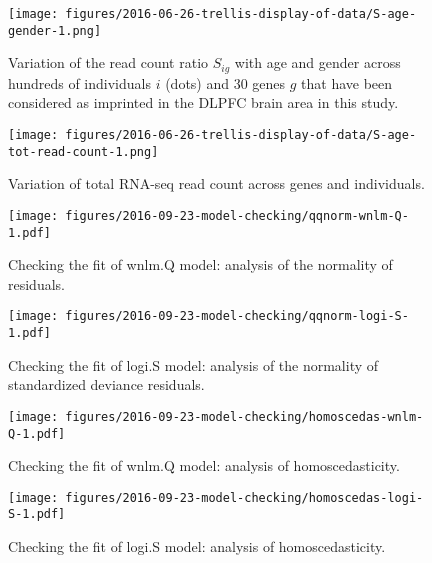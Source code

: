 \documentclass[letterpaper]{article}
\begin{document}
\begin{figure}[h]
\begin{center}
\texttt{[image: figures/2016-06-26-trellis-display-of-data/S-age-gender-1.png]}
\caption{
Variation of the read count ratio \(S_{ig}\) with age and gender across hundreds of individuals
\(i\) (dots) and 30 genes \(g\) that have been considered as imprinted in the DLPFC
brain area in this study.
}
\label{fig:S-age-gender}
\end{center}
\end{figure}

\begin{figure}[h]
\begin{center}
\texttt{[image: figures/2016-06-26-trellis-display-of-data/S-age-tot-read-count-1.png]}
\end{center}
\caption{Variation of total RNA-seq read count across genes and individuals.}
\label{fig:weight-of-evidence}
\end{figure}

\begin{figure}[h]
\begin{center}
\texttt{[image: figures/2016-09-23-model-checking/qqnorm-wnlm-Q-1.pdf]}
\end{center}
\caption{
Checking the fit of wnlm.Q model: analysis of the normality of residuals.
}
\label{fig:qqnorm-wnlm.Q}
\end{figure}

\begin{figure}[h]
\begin{center}
\texttt{[image: figures/2016-09-23-model-checking/qqnorm-logi-S-1.pdf]}
\end{center}
\caption{
Checking the fit of logi.S model: analysis of the normality of standardized deviance residuals.
}
\label{fig:qqnorm-logi.S}
\end{figure}

\begin{figure}[h]
\begin{center}
\texttt{[image: figures/2016-09-23-model-checking/homoscedas-wnlm-Q-1.pdf]}
\end{center}
\caption{
Checking the fit of wnlm.Q model: analysis of homoscedasticity.
}
\label{fig:homoscedas-wnlm.Q}
\end{figure}

\begin{figure}[h]
\begin{center}
\texttt{[image: figures/2016-09-23-model-checking/homoscedas-logi-S-1.pdf]}
\end{center}
\caption{
Checking the fit of logi.S model: analysis of homoscedasticity.
}
\label{fig:homoscedas-logi.S}
\end{figure}
\end{document}
